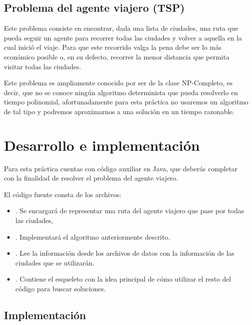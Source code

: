 \subsection{Problema del agente viajero (TSP)}

Este problema consiste en encontrar, dada una lista de ciudades, una ruta que pueda seguir un agente para recorrer todas las ciudades y volver a aquella en la cual inició el viaje.  Para que este recorrido valga la pena debe ser lo más económico posible o, en su defecto, recorrer la menor distancia que permita visitar todas las ciudades.

Este problema es ampliamente conocido por ser de la clase NP-Completo, es decir, que no se conoce ningún algoritmo determinista que pueda resolverlo en tiempo polinomial, afortunadamente para esta práctica no usaremos un algoritmo de tal tipo y podremos aproximarnos a una solución en un tiempo razonable.



\section{Desarrollo e implementaci\'on}

Para esta práctica cuentas con código auxiliar en Java, que deberás completar con la finalidad de resolver el problema del agente viajero.

El código fuente consta de los archivos:
\begin{itemize}
 \item {}. Se encargará de representar una ruta del agente viajero que pase por todas las ciudades,

 \item {}.  Implementará el algoritmo anteriormente descrito.

 \item {}.  Lee la información desde los archivos de datos con la información de las ciudades que se utilizarán.

 \item {}.  Contiene el esqueleto con la idea principal de cómo utilizar el resto del código para buscar soluciones.
\end{itemize}

\subsection{Implementaci\'on}

